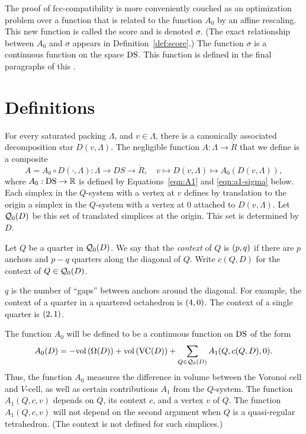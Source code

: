The proof of fcc-compatibility is more conveniently couched as an
optimization problem over a function that is related to the
function $A_0$ by an affine rescaling.   This new function is
called the score and is denoted $\sigma$.  (The exact relationship
between $A_0$ and $\sigma$ appears in Definition~\ref{def:score}.)
The function $\sigma$ is a continuous function on the space
${\operatorname{DS}}$. This function is defined in the final paragraphs of this
\chap.


\section{Definitions}
\label{sec:rules}


For every saturated packing $\Lambda$, and $v\in \Lambda$, there
is a canonically associated decomposition star $D(v,\Lambda)$. The
negligible function $A:\Lambda\to\ring{R}$ that we define is a
composite
  \begin{equation}
  A = A_0\circ D(\cdot,\Lambda)
  :\Lambda\to DS\to \ring{R},\quad v\mapsto D(v,\Lambda)\mapsto
  A_0(D(v,\Lambda)),
  \label{eqn:A}
  \end{equation}
where $A_0:{\operatorname{DS}}\to\mathbb{R}$ is defined by
Equations~\ref{eqn:A1} and \ref{eqn:a1-sigma} below.  Each simplex
in the $Q$-system with a vertex at $v$ defines by translation to
the origin a simplex in the $Q$-system with a vertex at $0$
attached to $D(v,\Lambda)$. Let ${\mathcal Q}_0(D)$ be this set of
translated simplices at the origin. This set is determined by $D$.

\begin{definition} \label{def:context}
Let $Q$ be a quarter in ${\mathcal Q}_0(D)$.  We say that the {\it
context\/} of $Q$ is $\relax(p,q)$ if there are $p$ anchors and $p-q$
quarters along the diagonal of $Q$. Write $c(Q,D)$ for the context
of $Q\in{\mathcal Q}_0(D)$.
\end{definition}

$q$ is the number of ``gaps'' between anchors around the diagonal.
For example, the context of a quarter in a quartered octahedron is
$\relax(4,0)$.  The context of a single quarter is $\relax(2,1)$.


The function $A_0$ will be defined to be
a continuous function on ${\operatorname{DS}}$ of the
form
  \begin{equation}
  A_0(D) = -{\operatorname{vol}}\,(\Omega(D)) + {\operatorname{vol}}\,({\operatorname{VC}}(D)) +
   \sum_{Q\in{\mathcal Q}_0(D)} A_1(Q,c(Q,D),0).
   \label{eqn:A1}
   \end{equation}
Thus, the function $A_0$ measures the difference in volume between
the Voronoi cell and $V$-cell, as well as certain contributions
$A_1$ from the $Q$-system. The function $A_1(Q,c,v)$ depends on
$Q$, its context $c$, and a vertex $v$ of $Q$.  The function
$A_1(Q,c,v)$ will not depend on the second argument when $Q$ is a
quasi-regular tetrahedron.  (The context is not defined for such
simplices.)



